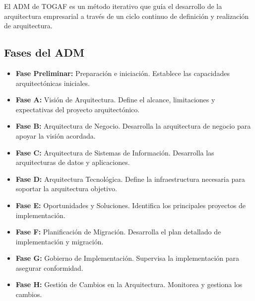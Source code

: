 El ADM de TOGAF es un método iterativo que guía el desarrollo de la arquitectura empresarial a través de un ciclo continuo de definición y realización de arquitectura.

\subsection{Fases del ADM}
\begin{itemize}
\item \textbf{Fase Preliminar:} Preparación e iniciación. Establece las capacidades arquitectónicas iniciales.
\item \textbf{Fase A:} Visión de Arquitectura. Define el alcance, limitaciones y expectativas del proyecto arquitectónico.
\item \textbf{Fase B:} Arquitectura de Negocio. Desarrolla la arquitectura de negocio para apoyar la visión acordada.
\item \textbf{Fase C:} Arquitectura de Sistemas de Información. Desarrolla las arquitecturas de datos y aplicaciones.
\item \textbf{Fase D:} Arquitectura Tecnológica. Define la infraestructura necesaria para soportar la arquitectura objetivo.
\item \textbf{Fase E:} Oportunidades y Soluciones. Identifica los principales proyectos de implementación.
\item \textbf{Fase F:} Planificación de Migración. Desarrolla el plan detallado de implementación y migración.
\item \textbf{Fase G:} Gobierno de Implementación. Supervisa la implementación para asegurar conformidad.
\item \textbf{Fase H:} Gestión de Cambios en la Arquitectura. Monitorea y gestiona los cambios.
\end{itemize}

